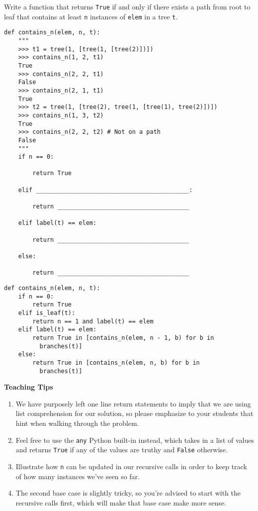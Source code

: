 \begin{blocksection}
\question Write a function that returns \lstinline{True} if and only if there exists a path from root to leaf that contains at least \lstinline{n} instances of \lstinline{elem} in a tree \lstinline{t}.

\begin{lstlisting}
def contains_n(elem, n, t):
    """
    >>> t1 = tree(1, [tree(1, [tree(2)])])
    >>> contains_n(1, 2, t1)
    True
    >>> contains_n(2, 2, t1)
    False
    >>> contains_n(2, 1, t1)
    True
    >>> t2 = tree(1, [tree(2), tree(1, [tree(1), tree(2)])])
    >>> contains_n(1, 3, t2)
    True
    >>> contains_n(2, 2, t2) # Not on a path
    False
    """
    if n == 0:

        return True

    elif ___________________________________________:

        return _____________________________________

    elif label(t) == elem:

        return _____________________________________

    else:

        return _____________________________________
\end{lstlisting}
\end{blocksection}

\begin{blocksection}
\begin{solution}
\begin{lstlisting}
def contains_n(elem, n, t):
    if n == 0:
        return True
    elif is_leaf(t):
        return n == 1 and label(t) == elem
    elif label(t) == elem:
        return True in [contains_n(elem, n - 1, b) for b in     
          branches(t)]
    else:
        return True in [contains_n(elem, n, b) for b in 
          branches(t)]
\end{lstlisting}
\end{solution}
\end{blocksection}

\begin{questionmeta}
    \textbf{Teaching Tips}
    \begin{enumerate}
            \item We have purposely left one line return statements to imply that we are using list comprehension for our solution, so please emphasize to your students that hint when walking through the problem.
            \item Feel free to use the \texttt{any} Python built-in instead, which takes in a list of values and returns \texttt{True} if any of the values are truthy and \texttt{False} otherwise.
            \item Illustrate how \texttt{n} can be updated in our recursive calls in order to keep track of how many instances we've seen so far.
            \item The second base case is slightly tricky, so you're advised to start with the recursive calls first, which will make that base case make more sense.
    \end{enumerate}
\end{questionmeta}